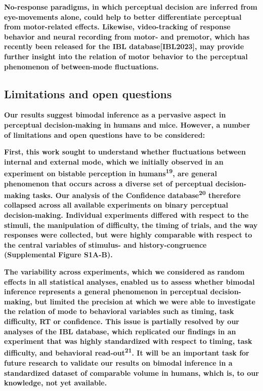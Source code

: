 \documentclass[
]{article}
\begin{document}
\textbf{No-response paradigms, in which perceptual decision are inferred
from eye-movements alone, could help to better differentiate perceptual
from motor-related effects. Likewise, video-tracking of response
behavior and neural recording from motor- and premotor, which has
recently been released for the IBL database{[}IBL2023{]}, may provide
further insight into the relation of motor behavior to the perceptual
phenomenon of between-mode fluctuations.}

\hypertarget{limitations-and-open-questions}{%
\subsection{Limitations and open
questions}\label{limitations-and-open-questions}}

\textbf{Our results suggest bimodal inference as a pervasive aspect in
perceptual decision-making in humans and mice. However, a number of
limitations and open questions have to be considered:}

\textbf{First, this work sought to understand whether fluctuations
between internal and external mode, which we initially observed in an
experiment on bistable perception in humans\textsuperscript{19}, are
general phenomenon that occurs across a diverse set of perceptual
decision-making tasks. Our analysis of the Confidence
database\textsuperscript{20} therefore collapsed across all available
experiments on binary perceptual decision-making. Individual experiments
differed with respect to the stimuli, the manipulation of difficulty,
the timing of trials, and the way responses were collected, but were
highly comparable with respect to the central variables of stimulus- and
history-congruence (Supplemental Figure S1A-B).}

\textbf{The variability across experiments, which we considered as
random effects in all statistical analyses, enabled us to assess whether
bimodal inference represents a general phenomenon in perceptual
decision-making, but limited the precision at which we were able to
investigate the relation of mode to behavioral variables such as timing,
task difficulty, RT or confidence. This issue is partially resolved by
our analyses of the IBL database, which replicated our findings in an
experiment that was highly standardized with respect to timing, task
difficulty, and behavioral read-out\textsuperscript{21}. It will be an
important task for future research to validate our results on bimodal
inference in a standardized dataset of comparable volume in humans,
which is, to our knowledge, not yet available.}
\end{document}
